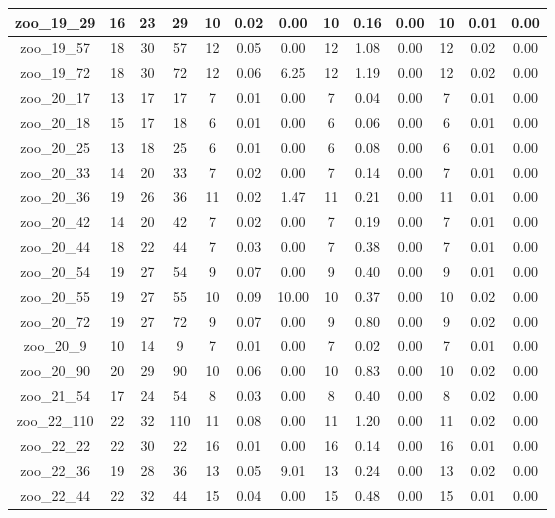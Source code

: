 \begin{landscape}
\begin{longtable}{|c|c|c|c|c|c|c|c|c|c|c|c|c|}
zoo\_19\_29 & 16 & 23 & 29 & 10 & 0.02 & 0.00 & 10 & 0.16 & 0.00 & 10 & 0.01 & 0.00 \\ \hline 
zoo\_19\_57 & 18 & 30 & 57 & 12 & 0.05 & 0.00 & 12 & 1.08 & 0.00 & 12 & 0.02 & 0.00 \\ \hline 
zoo\_19\_72 & 18 & 30 & 72 & 12 & 0.06 & 6.25 & 12 & 1.19 & 0.00 & 12 & 0.02 & 0.00 \\ \hline 
zoo\_20\_17 & 13 & 17 & 17 & 7 & 0.01 & 0.00 & 7 & 0.04 & 0.00 & 7 & 0.01 & 0.00 \\ \hline 
zoo\_20\_18 & 15 & 17 & 18 & 6 & 0.01 & 0.00 & 6 & 0.06 & 0.00 & 6 & 0.01 & 0.00 \\ \hline 
zoo\_20\_25 & 13 & 18 & 25 & 6 & 0.01 & 0.00 & 6 & 0.08 & 0.00 & 6 & 0.01 & 0.00 \\ \hline 
zoo\_20\_33 & 14 & 20 & 33 & 7 & 0.02 & 0.00 & 7 & 0.14 & 0.00 & 7 & 0.01 & 0.00 \\ \hline 
zoo\_20\_36 & 19 & 26 & 36 & 11 & 0.02 & 1.47 & 11 & 0.21 & 0.00 & 11 & 0.01 & 0.00 \\ \hline 
zoo\_20\_42 & 14 & 20 & 42 & 7 & 0.02 & 0.00 & 7 & 0.19 & 0.00 & 7 & 0.01 & 0.00 \\ \hline 
zoo\_20\_44 & 18 & 22 & 44 & 7 & 0.03 & 0.00 & 7 & 0.38 & 0.00 & 7 & 0.01 & 0.00 \\ \hline 
zoo\_20\_54 & 19 & 27 & 54 & 9 & 0.07 & 0.00 & 9 & 0.40 & 0.00 & 9 & 0.01 & 0.00 \\ \hline 
zoo\_20\_55 & 19 & 27 & 55 & 10 & 0.09 & 10.00 & 10 & 0.37 & 0.00 & 10 & 0.02 & 0.00 \\ \hline 
zoo\_20\_72 & 19 & 27 & 72 & 9 & 0.07 & 0.00 & 9 & 0.80 & 0.00 & 9 & 0.02 & 0.00 \\ \hline 
zoo\_20\_9 & 10 & 14 & 9 & 7 & 0.01 & 0.00 & 7 & 0.02 & 0.00 & 7 & 0.01 & 0.00 \\ \hline 
zoo\_20\_90 & 20 & 29 & 90 & 10 & 0.06 & 0.00 & 10 & 0.83 & 0.00 & 10 & 0.02 & 0.00 \\ \hline 
zoo\_21\_54 & 17 & 24 & 54 & 8 & 0.03 & 0.00 & 8 & 0.40 & 0.00 & 8 & 0.02 & 0.00 \\ \hline 
zoo\_22\_110 & 22 & 32 & 110 & 11 & 0.08 & 0.00 & 11 & 1.20 & 0.00 & 11 & 0.02 & 0.00 \\ \hline 
zoo\_22\_22 & 22 & 30 & 22 & 16 & 0.01 & 0.00 & 16 & 0.14 & 0.00 & 16 & 0.01 & 0.00 \\ \hline 
zoo\_22\_36 & 19 & 28 & 36 & 13 & 0.05 & 9.01 & 13 & 0.24 & 0.00 & 13 & 0.02 & 0.00 \\ \hline 
zoo\_22\_44 & 22 & 32 & 44 & 15 & 0.04 & 0.00 & 15 & 0.48 & 0.00 & 15 & 0.01 & 0.00 \\ \hline 

\end{longtable}
\end{landscape}
